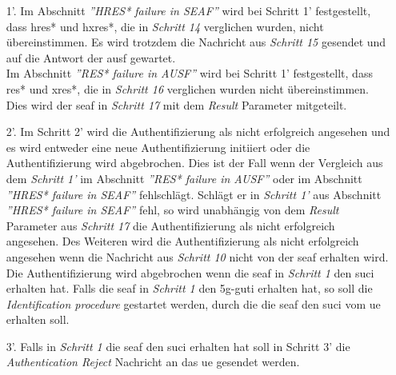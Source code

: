 \begin{enumerate}
\item[1'.] Im Abschnitt \textit{''HRES* failure in SEAF''} wird bei Schritt 1' festgestellt, dass \gls{hres*} und \gls{hxres*}, die in \textit{Schritt 14} verglichen wurden, nicht übereinstimmen. 
Es wird trotzdem die Nachricht aus \textit{Schritt 15} gesendet und auf die Antwort der \gls{ausf} gewartet. \\
Im Abschnitt \textit{''RES* failure in AUSF''} wird bei Schritt 1' festgestellt, dass \gls{res*} und \gls{xres*}, die in \textit{Schritt 16} verglichen wurden nicht übereinstimmen.
Dies wird der \gls{seaf} in \textit{Schritt 17} mit dem \textit{Result} Parameter mitgeteilt.

\item[2'.] Im Schritt 2' wird die Authentifizierung als nicht erfolgreich angesehen und es wird entweder eine neue Authentifizierung initiiert oder die Authentifizierung wird abgebrochen.
Dies ist der Fall wenn der Vergleich aus dem \textit{Schritt 1'} im Abschnitt \textit{''RES* failure in AUSF''} oder im Abschnitt \textit{''HRES* failure in SEAF''} fehlschlägt.
Schlägt er in \textit{Schritt 1'} aus Abschnitt \textit{''HRES* failure in SEAF''} fehl, so wird unabhängig von dem \textit{Result} Parameter aus \textit{Schritt 17} die Authentifizierung als nicht erfolgreich angesehen.
Des Weiteren wird die Authentifizierung als nicht erfolgreich angesehen wenn die Nachricht aus \textit{Schritt 10} nicht von der \gls{seaf} erhalten wird.
Die Authentifizierung wird abgebrochen wenn die \gls{seaf} in \textit{Schritt 1} den \gls{suci} erhalten hat.
Falls die \gls{seaf} in \textit{Schritt 1} den \gls{5g-guti} erhalten hat, so soll die \textit{Identification procedure} gestartet werden, durch die die \gls{seaf} den \gls{suci} vom \gls{ue} erhalten soll.

\item[3'.] Falls in \textit{Schritt 1} die \gls{seaf} den \gls{suci} erhalten hat soll in Schritt 3' die \textit{Authentication Reject} Nachricht an das \gls{ue} gesendet werden.
\end{enumerate}













